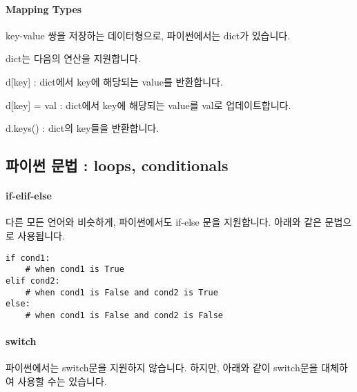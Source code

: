 \paragraph{Mapping Types} key-value 쌍을 저장하는 데이터형으로, 파이썬에서는 dict가 있습니다. 



dict는 다음의 연산을 지원합니다. 
\begin{compactitem} 
\item d[key] : dict에서 key에 해당되는 value를 반환합니다. 
\item d[key] = val : dict에서 key에 해당되는 value를 val로 업데이트합니다. 
\item d.keys() : dict의 key들을 반환합니다. 
\end{compactitem}




\subsection{파이썬 문법 : loops, conditionals} 

\paragraph{if-elif-else} 다른 모든 언어와 비슷하게, 파이썬에서도 if-else 문을 지원합니다. 아래와 같은 문법으로 사용됩니다. 

\begin{lstlisting}[style=python] 
if cond1:
    # when cond1 is True 
elif cond2:
    # when cond1 is False and cond2 is True
else:
    # when cond1 is False and cond2 is False
\end{lstlisting}

\paragraph{switch} 파이썬에서는 switch문을 지원하지 않습니다. 하지만, 아래와 같이 switch문을 대체하여 사용할 수는 있습니다. 






